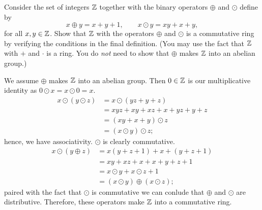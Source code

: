 
\setcounter{question}{0}
\question Consider the set of integers $\mathbb{Z}$ together with the binary operators $\oplus$ and $\odot$ define by
\[ x \oplus y = x + y + 1, \qquad x \odot y = xy + x + y, \]
for all $x, y \in \mathbb{Z}$. Show that $\mathbb{Z}$ with the operators $\oplus$ and $\odot$ is a commutative ring by verifying the conditions in the final definition. (You may use the fact that $\mathbb{Z}$ with $+$ and $\cdot$ is a ring. You do \emph{not} need to show that $\oplus$ makes $\mathbb{Z}$ into an abelian group.)
\begin{solution}
    We assume $\oplus$ makes $\mathbb{Z}$ into an abelian group.
    Then $0 \in \mathbb{Z}$ is our multiplicative identity as
    $0 \odot x = x \odot 0 = x$.
    \begin{align*}
        x \odot (y \odot z) 
        &= x \odot (yz + y + z) \\
        &= xyz + xy + xz + x + yz + y + z \\
        &= (xy + x + y) \odot z \\
        &= (x \odot y) \odot z;
    \end{align*}
    hence, we have associativity.
    $\odot$ is clearly commutative.
    \begin{align*}
        x \odot (y \oplus z)
        &= x(y + z + 1) + x + (y + z + 1) \\
        &= xy + xz + x + x + y + z + 1 \\
        &= x \odot y + x \odot z + 1 \\
        &= (x \odot y) \oplus (x \odot z);
    \end{align*}
    paired with the fact that $\odot$ is commutative we can conlude that $\oplus$ and $\odot$ are distributive.
    Therefore, these operators make $\mathbb{Z}$ into a commutative ring.
\end{solution}

